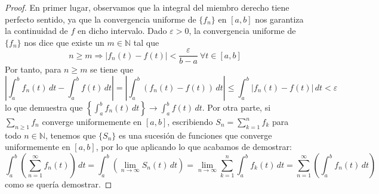 \begin{proof}
    En primer lugar, observamos que la integral del miembro derecho tiene perfecto sentido,
    ya que la convergencia uniforme de $\{f_n\}$ en $[a,b]$ nos garantiza la continuidad de $f$
    en dicho intervalo.
    \newline
    \newline
    Dado $\varepsilon > 0$, la convergencia uniforme de $\{f_n\}$ nos
    dice que existe un $m \in \mathbb{N}$ tal que
    \begin{equation*}
        n \geq m \Longrightarrow |f_n(t)-f(t)| < \frac{\varepsilon}{b-a} ~\forall t \in [a,b]
    \end{equation*}
    Por tanto, para $n \geq m$ se tiene que
    \begin{equation*}
        \left|\int_{a}^{b} f_n(t) \,dt - \int_{a}^{b} f(t) \,dt\right| =
        \left|\int_{a}^{b} (f_n(t) - f(t)) \,dt\right| \leq \int_{a}^{b} |f_n(t)-f(t)| \,dt < \varepsilon
    \end{equation*}
    lo que demuestra que $\left\{\displaystyle\int_{a}^{b} f_n(t) \,dt\right\} \rightarrow
    \displaystyle\int_{a}^{b} f(t) \,dt$.
    \newline
    \newline
    Por otra parte, si $\displaystyle\sum_{n \geq 1} f_n$ converge uniformemente en $[a,b]$,
    escribiendo $S_n=\displaystyle\sum_{k=1}^{n} f_k$ para todo $n \in \mathbb{N}$, tenemos
    que $\{S_n\}$ es una sucesión de funciones que converge uniformemente en $[a,b]$, por
    lo que aplicando lo que acabamos de demostrar:
    \begin{equation*}
        \displaystyle\int_{a}^{b} \left(\displaystyle\sum_{n=1}^{\infty} f_n(t)\right) \,dt=
        \displaystyle\int_{a}^{b} \left(\lim_{n \to \infty} S_n(t) \,dt\right) =
        \lim_{n \to \infty} \displaystyle\sum_{k=1}^{n} \displaystyle\int_{a}^{b} f_k(t) \,dt =
        \displaystyle\sum_{n=1}^{\infty} \left(\int_{a}^{b} f_n(t) \,dt\right)
    \end{equation*}
    como se quería demostrar.
    \end{proof}
